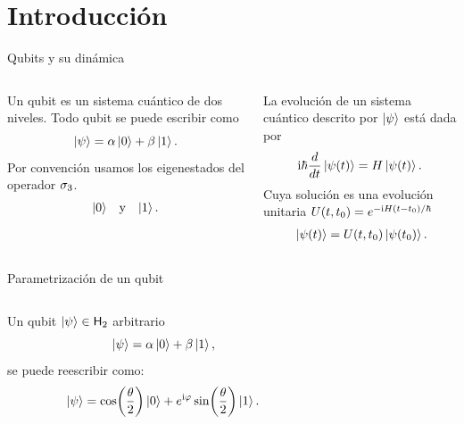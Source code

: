 \section{Introducción}

\begin{frame}{Qubits y su dinámica}
    \begin{columns}
        \begin{column}{0.5\textwidth}
            \begin{center}
                Un qubit es un sistema cuántico de dos niveles.
                \pause
                Todo qubit se puede escribir como
                \begin{equation}
                    \ket{\psi}=\alpha\ket{0}+\beta\ket{1}.\nonumber
                \end{equation}
                \pause
                Por convención usamos los eigenestados del operador $\sigma_{3}$.
                \begin{align}
                    \ket{0} & & \text{y} & & \ket{1}. \nonumber
                \end{align} 
            \end{center}
        \end{column}
        \pause
        \begin{column}{0.5\textwidth}
            La evolución de un sistema cuántico descrito por $\ket{\psi}$ está dada por
            \begin{equation}
                \text{i}\hbar\frac{d}{dt}\ket{\psi(t)}=H\ket{\psi(t)}.\nonumber
            \end{equation}
            \pause
            Cuya solución es una evolución unitaria $U(t,t_{0})=e^{-\text{i} H(t-t_{0})/\hbar}$
            \begin{align}
                \ket{\psi(t)}=U(t,t_{0})\ket{\psi(t_{0})} \rlap{.}\nonumber
            \end{align}
        \end{column}
    \end{columns}
\end{frame}
\begin{frame}{Parametrización de un qubit}
    \begin{columns}
        \begin{column}{0.5\textwidth}
            Un qubit $\ket{\psi}\in{\sf H}_{2}$ arbitrario
            \begin{equation}
                \ket{\psi}=\alpha\ket{0}+\beta\ket{1},\nonumber
            \end{equation}
            \pause
            se puede reescribir como:
            \begin{equation}
                \ket{\psi}=\cos(\frac{\theta}{2})\ket{0}+e^{\text{i}\varphi}\sin(\frac{\theta}{2})\ket{1}.\nonumber
            \end{equation}
        \end{column}
        \pause
        \begin{column}{0.5\textwidth}
            \centering
            \BlochSphere
        \end{column}
    \end{columns}
\end{frame}
